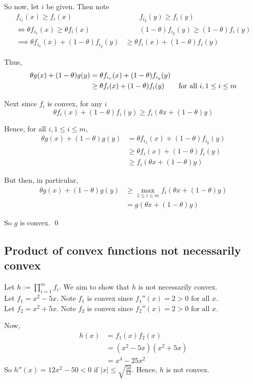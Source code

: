 \documentclass[paper=a4, fontsize=11pt]{scrartcl} %
\numberwithin{equation}{section} %
\numberwithin{figure}{section} %
\numberwithin{table}{section} %
\begin{document}
So now, let $i$ be given. Then note
\begin{align*}
f_{i_x}(x) \geq f_i(x) \qquad{} & \qquad{} f_{i_y}(y)\geq f_i(y) \\
\iff \theta f_{i_x}(x) \geq \theta f_i(x) \qquad{} & \qquad{} (1-\theta) f_{i_y}(y)\geq (1-\theta) f_i(y) \\
\implies \theta f_{i_x}(x) + (1-\theta) f_{i_y}(y) &\geq \theta f_i(x) + (1-\theta) f_i(y)
\end{align*}

Thus, 
\begin{align*}
\theta g(x) + (1-\theta)g(y) &= \theta f_{i_x}(x) + (1-\theta)f_{i_y}(y) \\
   &\geq \theta f_i(x) + (1-\theta) f_i(y) \qquad \text{for all $ i, 1\leq i \leq m$}
\end{align*}

Next since $f_i$ is convex, for any $i$
\[\theta f_i(x) + (1-\theta)f_i(y) \geq f_i(\theta x + (1-\theta)y)\]

Hence, for all $i, 1 \leq i \leq m$,
\begin{align*}
\theta g(x) + (1-\theta) g(y) &= \theta f_{i_x}(x) + (1-\theta)f_{i_y}(y) \\
   &\geq \theta f_i(x) + (1-\theta) f_i(y) \\
   &\geq f_i\left(\theta x + (1-\theta)y\right)
\end{align*}

But then, in particular,
\begin{align*}
\theta g(x) + (1-\theta) g(y) &\geq \max_{1 \leq i \leq m}  f_i\left(\theta x + (1-\theta)y\right) \\
   &= g\left(\theta x + (1-\theta)y\right)
\end{align*}

So $g$ is convex. \qed

\subsection{Product of convex functions not necessarily convex}

Let $h := \prod_{i=1}^m f_i$. We aim to show that $h$ is not necessarily convex.\\

Let $f_1 = x^2 - 5x$. Note $f_1$ is convex since $f_1''(x) = 2 > 0 \text{ for all } x$.\\
Let $f_2 = x^2 + 5x$. Note $f_2$ is convex since $f_2''(x) = 2 > 0 \text{ for all } x$.

Now,
\begin{align*}
h(x) &= f_1(x)f_2(x) \\
   &= (x^2 - 5x)(x^2 + 5x) \\ 
   &= x^4 - 25x^2
\end{align*}
So $h''(x) = 12x^2 - 50 < 0 \text{ if } |x| \leq \sqrt{\frac{50}{12}}$.
Hence, $h$ is not convex.
\end{document}
